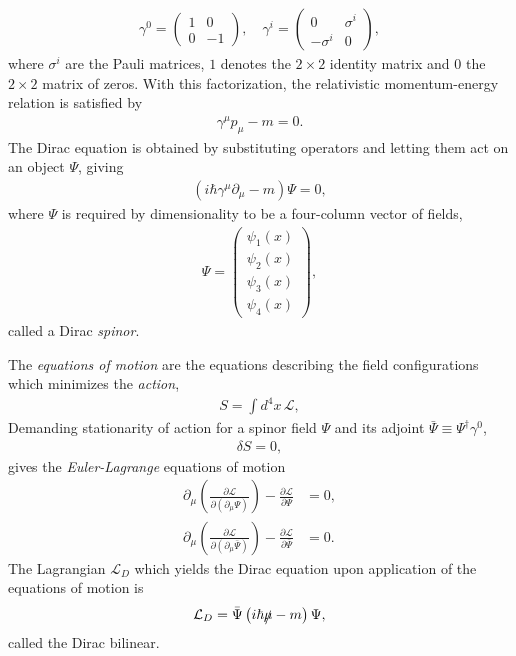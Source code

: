 \documentclass[twoside,english]{uiofysmaster}
\begin{document}
\begin{align}
	\gamma^0 = \begin{pmatrix}
		1 & 0 \\ 0 & -1
	\end{pmatrix}, \quad{} \gamma^i = \begin{pmatrix}
		0 & \sigma^i \\ -\sigma^i & 0
	\end{pmatrix},
\end{align}
where $\sigma^i$ are the Pauli matrices, $1$ denotes the $2\times 2$ identity matrix and $0$ the $2\times 2$ matrix of zeros. With this factorization, the relativistic momentum-energy relation is satisfied by
\begin{align}
	\gamma^\mu p_\mu - m = 0.
\end{align}
The Dirac equation is obtained by substituting operators and letting them act on an object $\Psi$, giving
\begin{align}
	\left(i\hbar \gamma^\mu \partial_\mu - m\right)\Psi = 0,
\end{align}
where $\Psi$ is required by dimensionality to be a four-column vector of fields,
\begin{align}
	\Psi = \begin{pmatrix}
		\psi_1(x) \\ \psi_2(x) \\ \psi_3(x) \\ \psi_4(x)
	\end{pmatrix},
\end{align}
called a Dirac {\it spinor}.

The {\it equations of motion} are the equations describing the field configurations which minimizes the {\it action},
\begin{align}
	S = \int d^4 x \, \mathcal{L},
\end{align}
Demanding stationarity of action for a spinor field $\Psi$ and its adjoint $\bar\Psi \equiv  \Psi^\dag \gamma^0$,
\begin{align}
	\delta S = 0,
\end{align}
gives the {\it Euler-Lagrange} equations of motion
\begin{align}
	\partial_{\mu}\left(\frac{\partial\mathcal{L}}{\partial\left(\partial_{\mu}\Psi\right)}\right) - \frac{\partial\mathcal{L}}{\partial\Psi} &= 0,\\
	\partial_{\mu}\left(\frac{\partial\mathcal{L}}{\partial\left(\partial_{\mu}\bar\Psi\right)}\right) - \frac{\partial\mathcal{L}}{\partial\bar\Psi} &= 0.
\end{align}
The Lagrangian $\mathcal{L}_D$ which yields the Dirac equation upon application of the equations of motion is
\begin{align}
	\mathcal{L}_D = \bar \Psi \left( i\hbar \slashed \mu - m \right)\Psi,
\end{align}
called the Dirac bilinear.
\end{document}
